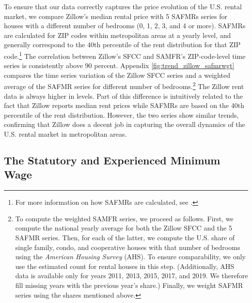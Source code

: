 To ensure that our data correctly captures the price evolution of the U.S. rental market, 
we compare Zillow's median rental price with 5 SAFMRs series for houses with a different 
number of bedrooms (0, 1, 2, 3, and 4 or more). SAFMRs are calculated for ZIP codes within 
metropolitan areas at a yearly level, and generally correspond to the 40th percentile of 
the rent distribution for that ZIP code.\footnote{For more information on how SAFMRs are 
	calculated, see \textcite[][page 41641]{hudPreamble}.} 
The correlation between Zillow's SFCC and SAMFR's ZIP-code-level time series is 
consistently above 90 percent. Appendix \autoref{fig:trend_zillow_safmrwgt} compares the 
time series variation of the Zillow SFCC series and a weighted average of the SAFMR series 
for different number of bedrooms.\footnote{	\label{foot:zillow_time_series}
	To compute the weighted SAMFR series, we proceed as follows. First, we compute the 
	national yearly average for both the Zillow SFCC and the 5 SAFMR series. Then, for 
	each of the latter, we compute the U.S. share of single family, condo, and cooperative 
	houses with that number of bedrooms using the \textit{American Housing Survey} (AHS). 
	To ensure comparability, we only use the estimated count for rental houses in this 
	step. (Additionally, AHS data is available only for years 2011, 2013, 2015, 2017, and 
	2019. We therefore fill missing years with the previous year's share.) Finally, we 
	weight SAFMR series using the shares mentioned above.} 
The Zillow rent data is always higher in levels. Part of this difference is intuitively 
related to the fact that Zillow reports median rent prices while SAFMRs are based on the 
40th percentile of the rent distribution. However, the two series show similar trends, 
confirming that Zillow does a decent job in capturing the overall dynamics of the U.S. 
rental market in metropolitan areas.

\subsection{The Statutory and Experienced Minimum Wage}\label{sec:mw_construction}

